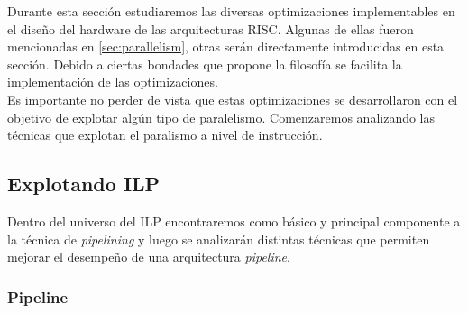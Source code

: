 Durante esta sección estudiaremos las diversas optimizaciones implementables en 
el diseño del hardware de las arquitecturas RISC. Algunas de ellas fueron 
mencionadas en \ref{sec:parallelism}, otras serán directamente introducidas en 
esta sección. Debido a ciertas bondades que propone la filosofía se facilita la 
implementación de las optimizaciones.\\
Es importante no perder de vista que estas optimizaciones se desarrollaron con 
el objetivo de explotar algún tipo de paralelismo. Comenzaremos analizando las 
técnicas que explotan el paralismo a nivel de instrucción.

\subsection{Explotando ILP}
\label{subsec:optimizations-ilp}

Dentro del universo del ILP encontraremos como básico y principal componente a 
la técnica de \emph{pipelining} y luego se analizarán distintas técnicas que 
permiten mejorar el desempeño de una arquitectura \emph{pipeline}.

\subsubsection{Pipeline}
\label{subsubsec:optimizations-ilp-pipeline}

